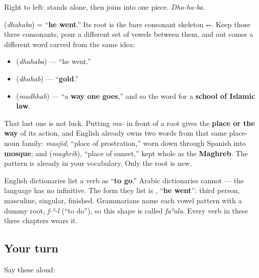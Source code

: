 Right to left: \textbf{} stands alone, then \textbf{} joins into one piece. \emph{Dha-ha-ba}.

\begin{cousinweb}
\textbf{} (\emph{dhahaba}) = \textquotedblleft{}\textbf{he went}.\textquotedblright{} Its root is the bare consonant skeleton \textbf{--}. Keep those three consonants, pour a different set of vowels between them, and out comes a different word carved from the same idea:

\begin{itemize}
\raggedright
  \item \textbf{} (\emph{dhahaba}) — \textquotedblleft{}he went.\textquotedblright{}
  \item \textbf{} (\emph{dhahab}) — \textquotedblleft{}\textbf{gold}.\textquotedblright{}
  \item \textbf{} (\emph{madhhab}) — \textquotedblleft{}a \textbf{way one goes},\textquotedblright{} and so the word for a \textbf{school of Islamic law}.
\end{itemize}

That last one is not luck. Putting \emph{ma-} in front of a root gives the \textbf{place or the way} of its action, and English already owns two words from that same place-noun family: \emph{masjid}, \textquotedblleft{}place of prostration,\textquotedblright{} worn down through Spanish into \textbf{mosque}; and \textbf{} (\emph{maghrib}), \textquotedblleft{}place of sunset,\textquotedblright{} kept whole as the \textbf{Maghreb}. The pattern is already in your vocabulary. Only the root is new.
\end{cousinweb}

\begin{grammarlens}[title={Grammar Lens — Arabic has no \textquotedblleft{}to go\textquotedblright{}}]
English dictionaries list a verb as \textquotedblleft{}\textbf{to go}.\textquotedblright{} Arabic dictionaries cannot — the language has no infinitive. The form they list is \textbf{}, \textquotedblleft{}\textbf{he went}\textquotedblright{}: third person, masculine, singular, finished. Grammarians name each vowel pattern with a dummy root, \emph{f-ʿ-l} (\textquotedblleft{}to do\textquotedblright{}), so this shape is called \emph{faʿala}. Every verb in these three chapters wears it.
\end{grammarlens}

\subsection*{Your turn}
Say these aloud:

